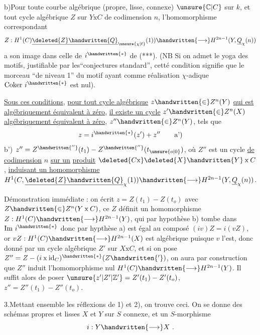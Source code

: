 b)\quad Pour toute courbe algébrique (propre, lisse, connexe) $\unsure{\mathbb{C}|C}$ sur $k$, et tout cycle algébrique $Z$ sur $Y\mathbin{\mathrm{x}}C$ de codimension $n$, l'homomorphisme correspondant
\[
Z:H^1(C)\underline{\deleted{Z}\handwritten{Q}}_{\unsure{\chi|\ell}}(1))\handwritten{\longrightarrow}H^{2n-1}(Y,\underline{Q}_{\chi}(n))
\]
a son image dans celle de $i^{\handwritten{*}}$ de (***). (NB Si on admet le yoga des motifs, justifiable par les``conjectures standard'', cetté condition signifie que le  morceau  ``de niveau 1'' du motif  ayant comme réalisation $\chi$-adique $\mathrm{Coker}\ i^{\handwritten{*}}$ est nul).

\uline{Sous ces conditions}, \uline{pour tout cycle algébrique} $z\handwritten{\in}Z^n(Y)$ \uline{qui est algébriquement équivalent à zéro}, \uline{il existe un cycle} $z'\handwritten{\in}Z^n(X)$ \uline{algébriquement équivalent à zéro},  $z''\handwritten{\in}Z^n(Y)$, tels que
\[
z=i^{\handwritten{*}}(z')+z''\tag*{a')}
\]
b')\quad {} $z''=Z^{\handwritten{''}}(t_1)-Z^{\handwritten{''}}(t_{\unsure{o|0}})$, où $Z''$ est un cycle \uline{de codimension} $n$ \uline{sur un} \uline{produit} $\deleted{C\mathbin{\mathrm{x}}}\deleted{X}\handwritten{Y}\mathbin{\mathrm{x}}C$, \uline{induisant un homomorphisme}   $H^1(C,\underline{\deleted{Z}\handwritten{Q}}_{\chi}(1))\handwritten{\longrightarrow}H^{2n-1}(Y,\underline{Q}_{\chi}(n))$.

Démonstration immédiate : on écrit $z=Z(t_1)-Z(t_o)$ avec $Z\handwritten{\in}Z^n(Y\mathbin{\mathrm{x}}C)$, ce $Z$ définit un homomorphisme $Z:H^1(C)\handwritten{\longrightarrow}H^{2n-1}(Y)$,  qui par hypothèse b) tombe dans $\mathrm{Im}\ i^{\handwritten{*}}$ donc par hypthèse a) est égal au composé $(iv)Z=i(vZ)$, or $vZ:H^1(C)\handwritten{\longrightarrow}H^{2n-1}(X)$ est algébrique puisque $v$ l'est, donc donné par un cycle algébrique $Z'$ sur $X\mathbin{\mathrm{x}}C$, et si on pose $Z''=Z-(i\mathbin{\mathrm{x}}\mathrm{id}_C)^{\handwritten{*}}(Z\handwritten{'})$, on aura par construction que $Z''$ induit l'homomorphisme nul $H^1(C)\handwritten{\longrightarrow}H^{2n-1}(Y)$.  Il suffit alors de poser $\unsure{z'|Z'|\mathbb{Z}'}=Z'(t_1)-Z'(t_o)$, $z''=Z''(t_1)-Z''(t_o)$.

3.\quad Mettant ensemble les réflexions de 1) et 2), on trouve ceci. On se donne des schémas propres et lisses $X$ et $Y$ sur $S$  connexe, et un $S$-morphisme
\[
i:Y\handwritten{\longrightarrow}X\ .
\]
